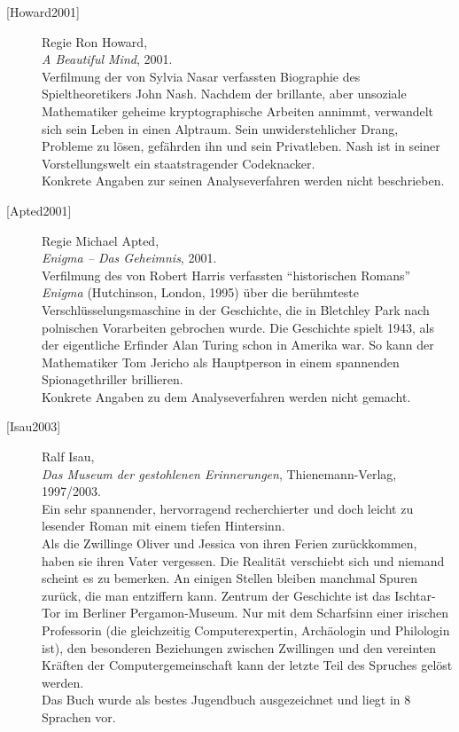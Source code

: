 \begin{description}
\item[\textrm{[Howard2001]}] 
    Regie Ron Howard, \\
    {\em A Beautiful Mind}, 2001. \\
    Verfilmung der von Sylvia Nasar verfassten Biographie des
    Spieltheoretikers John Nash.
    Nachdem der brillante, aber unsoziale Mathematiker geheime kryptographische
    Arbeiten annimmt, verwandelt sich sein Leben in einen Alptraum. Sein
    unwiderstehlicher Drang, Probleme zu lösen, gefährden ihn und sein
    Privatleben.
    Nash ist in seiner Vorstellungswelt ein staatstragender Codeknacker. \\
    Konkrete Angaben zur seinen Analyseverfahren werden nicht beschrieben.\\


\item[\textrm{[Apted2001]}] 
    Regie Michael Apted, \\
    {\em Enigma -- Das Geheimnis}, 2001. \\
    Verfilmung des von Robert Harris verfassten "`historischen Romans"'
    {\em Enigma} (Hutchinson, London, 1995) über die berühmteste
    Verschlüsselungsmaschine in der Geschichte, die in
    Bletchley Park nach polnischen Vorarbeiten gebrochen wurde.
    Die Geschichte spielt 1943, als der eigentliche Erfinder Alan Turing
    schon in Amerika war. So kann der Mathematiker Tom Jericho als Hauptperson
    in einem spannenden Spionagethriller brillieren.\\
    Konkrete Angaben zu dem Analyseverfahren werden nicht gemacht.\\


\item[\textrm{[Isau2003]}] 
    Ralf Isau, \\
    {\em Das Museum der gestohlenen Erinnerungen}, Thienemann-Verlag, 1997/2003. \\
    Ein sehr spannender, hervorragend recherchierter und doch leicht zu lesender
    Roman mit einem tiefen Hintersinn.\\
    Als die Zwillinge Oliver und Jessica von ihren Ferien zurückkommen, haben sie
    ihren Vater vergessen. Die Realität verschiebt sich und niemand scheint es zu
    bemerken. An einigen Stellen bleiben manchmal Spuren zurück, die man
    entziffern kann.
    Zentrum der Geschichte ist das Ischtar-Tor im Berliner Pergamon-Museum.
    Nur mit dem Scharfsinn einer irischen Professorin (die gleichzeitig
    Computerexpertin, Archäologin und Philologin ist), den besonderen
    Beziehungen zwischen Zwillingen und den vereinten Kräften der
    Computergemeinschaft kann der letzte Teil des Spruches gelöst werden.\\
    Das Buch wurde als bestes Jugendbuch ausgezeichnet und liegt in 8 Sprachen vor.\\



\end{description}
